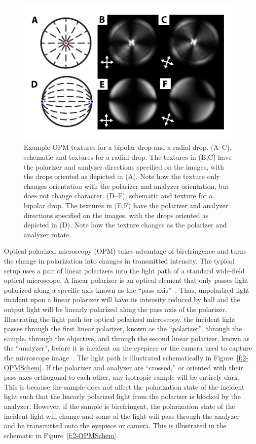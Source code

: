 \begin{figure}[h]
  \centering
  \includegraphics{figures/C2/Ch2-Figs_OPMDrops.png}
  \caption{Example OPM textures for a bipolar drop and a radial drop.
  (A--C), schematic and textures for a radial drop.
  The textures in (B,C) have the polarizer and analyzer directions specified on the images, with the drops oriented as depicted in (A).
  Note how the texture only changes orientation with the polarizer and analyzer orientation, but does not change character.
  (D--F), schematic and texture for a bipolar drop.
  The textures in (E,F) have the polarizer and analyzer directions specified on the images, with the drops oriented as depicted in (D).
  Note how the texture changes as the polarizer and analyzer rotate.
  }\label{f:2-OPMDrops}
\end{figure}

Optical polarized microscopy (OPM) takes advantage of birefringence and turns the change in polarization into changes in transmitted intensity.
The typical setup uses a pair of linear polarizers into the light path of a standard wide-field optical microscope.
A linear polarizer is an optical element that only passes light polarized along a specific axis known as the ``pass axis''~\cite{RN232}.
Thus, unpolarized light incident upon a linear polarizer will have its intensity reduced by half and the output light will be linearly polarized along the pass axis of the polarizer.
Illustrating the light path for optical polarized microscopy, the incident light passes through the first linear polarizer, known as the ``polarizer'', through the sample, through the objective, and through the second linear polarizer, known as the ``analyzer'', before it is incident on the eyepiece or the camera used to capture the microscope image~\cite{RN232}.
The light path is illustrated schematically in Figure~\ref{f:2-OPMSchem}.
If the polarizer and analyzer are ``crossed,'' or oriented with their pass axes orthogonal to each other, any isotropic sample will be entirely dark.
This is because the sample does not affect the polarization state of the incident light such that the linearly polarized light from the polarizer is blocked by the analyzer.
However, if the sample is birefringent, the polarization state of the incident light will change and some of the light will pass through the analyzer and be transmitted onto the eyepiece or camera.
This is illustrated in the schematic in Figure~\ref{f:2-OPMSchem}.

